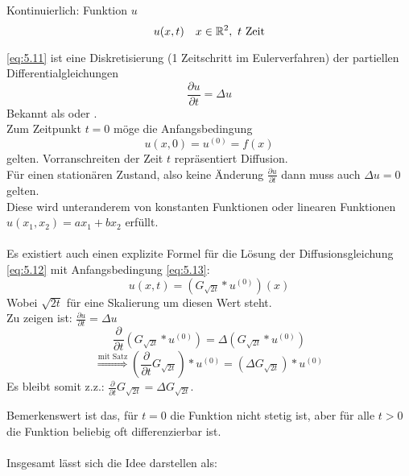     Kontinuierlich: Funktion $u$
    \[u(x,t) \quad x \in \mathbb{R}^2, \ t \text{ Zeit} \]

    \eqref{eq:5.11} ist eine Diskretisierung (1 Zeitschritt im Eulerverfahren) der partiellen Differentialgleichungen
    \begin{equation}\label{eq:5.12}
        \frac{\partial u}{\partial t} = \Delta u
    \end{equation}
    Bekannt als  oder .\\
    Zum Zeitpunkt $t=0$ möge die Anfangsbedingung
    \begin{equation}\label{eq:5.13}
        u(x,0)=u^{(0)}=f(x)
    \end{equation}
    gelten. Vorranschreiten der Zeit $t$ repräsentiert Diffusion.\\
    Für einen stationären Zustand, also keine Änderung $\frac{\partial u}{\partial t}$ dann muss auch $\Delta u =0$ gelten.\\
    Diese wird unteranderem von konstanten Funktionen oder linearen Funktionen $u(x_1,x_2) = ax_1 + bx_2$ erfüllt.\\
    \ \\
    Es existiert auch einen explizite Formel für die Lösung der Diffusionsgleichung \eqref{eq:5.12} mit Anfangsbedingung \eqref{eq:5.13}:
    \[u(x,t) = \left( G_{\sqrt{2t}} * u^{(0)} \right)(x)\]
    Wobei $\sqrt{2t}$ für eine Skalierung um diesen Wert steht.\\
    Zu zeigen ist: $\displaystyle \frac{\partial u}{\partial t} = \Delta u$
    \[\frac{\partial}{\partial t}  \left( G_{\sqrt{2t}} * u^{(0)} \right) = \Delta  \left( G_{\sqrt{2t}} * u^{(0)} \right)\]
    \[\overset{\text{mit Satz}}{\Longrightarrow}  \left( \frac{\partial}{\partial t} G_{\sqrt{2t}} \right)* u^{(0)} =  \left( \Delta G_{\sqrt{2t}} \right) * u^{(0)}\]
    Es bleibt somit z.z.: $\frac{\partial}{\partial t} G_{\sqrt{2t}} = \Delta G_{\sqrt{2t}}$.

    \begin{center}
    \end{center}
    Bemerkenswert ist das, für $t=0$ die Funktion nicht stetig ist, aber für alle $t>0$ die Funktion beliebig oft differenzierbar ist.\\
    \ \\
    Insgesamt lässt sich die Idee darstellen als:

